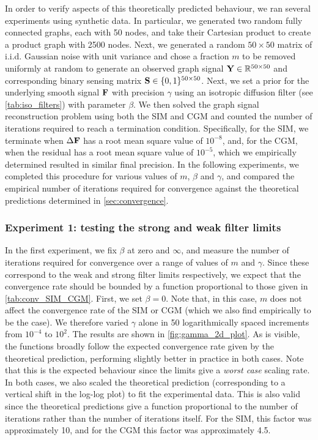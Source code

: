 In order to verify aspects of this theoretically predicted behaviour, we ran several experiments using synthetic data. In particular, we generated two random fully connected graphs, each with 50 nodes, and take their Cartesian product to create a product graph with 2500 nodes. Next, we generated a random $50 \times 50$ matrix of i.i.d. Gaussian noise with unit variance and chose a fraction $m$ to be removed uniformly at random to generate an observed graph signal $\mathbf{Y} \in \mathbb{R}^{50 \times 50}$ and corresponding binary sensing matrix $\mathbf{S} \in \{0, 1\}^{50 \times 50}$. Next, we set a prior for the underlying smooth signal $\mathbf{F}$ with precision $\gamma$ using an isotropic diffusion filter (see \cref{tab:iso_filters}) with parameter $\beta$. We then solved the graph signal reconstruction problem using both the SIM and CGM and counted the number of iterations required to reach a termination condition. Specifically, for the SIM, we terminate when $\Delta\mathbf{F}$ has a root mean square value of $10^{-8}$, and, for the CGM, when the residual has a root mean square value of $10^{-5}$, which we empirically determined resulted in similar final precision. In the following experiments, we completed this procedure for various values of $m$, $\beta$ and $\gamma$, and compared the empirical number of iterations required for convergence against the theoretical predictions determined in \cref{sec:convergence}. 
 
\subsubsection{Experiment 1: testing the strong and weak filter limits}

In the first experiment, we fix $\beta$ at zero and $\infty$, and measure the number of iterations required for convergence over a range of values of $m$ and $\gamma$. Since these correspond to the weak and strong filter limits respectively, we expect that the convergence rate should be bounded by a function proportional to those given in \cref{tab:conv_SIM_CGM}. First, we set $\beta=0$. Note that, in this case, $m$ does not affect the convergence rate of the SIM or CGM (which we also find empirically to be the case). We therefore varied $\gamma$ alone in 50 logarithmically spaced increments from $10^{-4}$ to $10^2$. The results are shown in \cref{fig:gamma_2d_plot}. As is visible, the functions broadly follow the expected convergence rate given by the theoretical prediction, performing slightly better in practice in both cases. Note that this is the expected behaviour since the limits give a \textit{worst case} scaling rate. In both cases, we also scaled the theoretical prediction (corresponding to a vertical shift in the log-log plot) to fit the experimental data. This is also valid since the theoretical predictions give a function proportional to the number of iterations rather than the number of iterations itself. For the SIM, this factor was approximately 10, and for the CGM this factor was approximately 4.5. 
 

